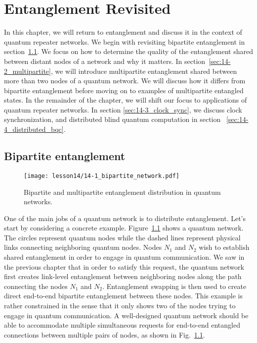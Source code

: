 \chapter{Entanglement Revisited}

In this chapter, we will return to entanglement and discuss it in the context of quantum repeater networks.
We begin with revisiting bipartite entanglement in section~\ref{sec:14-1_bipartite}.
We focus on how to determine the quality of the entanglement shared between distant nodes of a network and why it matters.
In section~\ref{sec:14-2_multipartite}, we will introduce multipartite entanglement shared between more than two nodes of a quantum network.
We will discuss how it differs from bipartite entanglement before moving on to examples of multipartite entangled states.
In the remainder of the chapter, we will shift our focus to applications of quantum repeater networks.
In section \ref{sec:14-3_clock_sync}, we discuss clock synchronization, and distributed blind quantum computation in section ~\ref{sec:14-4_distributed_bqc}.



\section{Bipartite entanglement}
\label{sec:14-1_bipartite}

\begin{figure}[t]
    \centering
    \texttt{[image: lesson14/14-1\_bipartite\_network.pdf]}
    \caption[Bipartite and multipartite entanglement]{Bipartite and multipartite entanglement distribution in quantum networks.}
    \label{fig:14-1_bipartite_multipartite}
\end{figure}

One of the main jobs of a quantum network is to distribute entanglement.
Let's start by considering a concrete example.
Figure~\ref{fig:14-1_bipartite_multipartite} shows a quantum network.
The circles represent quantum nodes while the dashed lines represent physical links connecting neighboring quantum nodes.
Nodes $N_1$ and $N_2$ wish to establish shared entanglement in order to engage in quantum communication.
We saw in the previous chapter that in order to satisfy this request, the quantum network first creates link-level entanglement between neighboring nodes along the path connecting the nodes $N_1$ and $N_2$.
Entanglement swapping is then used to create direct end-to-end bipartite entanglement between these nodes.
This example is rather constrained in the sense that it only shows two of the nodes trying to engage in quantum communication.
A well-designed quantum network should be able to accommodate multiple simultaneous requests for end-to-end entangled connections between multiple pairs of nodes, as shown in Fig.~\ref{fig:14-1_bipartite_multipartite}. 

